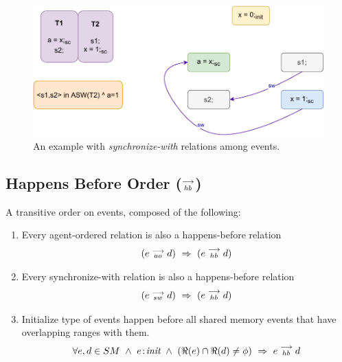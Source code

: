         \begin{figure}[H]
            \centering
            \includegraphics[scale=0.7]{4.ECMAScriptMemoryModel/SynchronizeWith.pdf}
            \caption{An example with \textit{synchronize-with} relations among events.}
        \end{figure}

        
    \subsection{Happens Before Order ($\stackrel{\longrightarrow}{_{hb}}$)}
        A transitive order on events, composed of the following:
        
        \begin{enumerate}
            \item Every agent-ordered relation is also a happens-before relation 
                \begin{align*}
                    (\reln{e}{ao}{d}) \ \Rightarrow{} \ (\reln{e}{hb}{d})    
                \end{align*}
                
            \item Every synchronize-with relation is also a happens-before relation 
                \begin{align*}
                    (\reln{e}{sw}{d}) \ \Rightarrow{} \ (\reln{e}{hb}{d})    
                \end{align*}
                 
            \item Initialize type of events happen before all shared memory events that have overlapping ranges with them. 
                \begin{align*}
                    \forall e,d \in SM \ \wedge \ 
                    \et{e}{init} \ \wedge \ 
                    (\Re(e) \cap \Re(d) \neq \phi)
                    \ \Rightarrow{} \ 
                    \reln{e}{hb}{d}
                \end{align*}          
        \end{enumerate}
    
